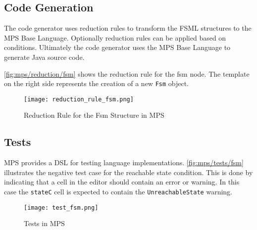 \subsection{Code Generation}

The code generator uses reduction rules to transform the FSML structures to the MPS Base Language.
Optionally reduction rules can be applied based on conditions.
Ultimately the code generator uses the MPS Base Language to generate Java source code.

\autoref{fig:mps/reduction/fsm} shows the reduction rule for the fsm node. 
The template on the right side represents the creation of a new \lstinline{Fsm} object.

\begin{figure}[H]
	\texttt{[image: reduction\_rule\_fsm.png]}
	\caption{Reduction Rule for the Fsm Structure in MPS}
	\label{fig:mps/reduction/fsm}
\end{figure}

\subsection{Tests}

MPS provides a DSL for testing language implementations.
\autoref{fig:mps/tests/fsm} illustrates the negative test case for the reachable state condition. 
This is done by indicating that a cell in the editor should contain an error or warning.
In this case the \lstinline{stateC} cell is expected to contain the \lstinline{UnreachableState} warning.


\begin{figure}[H]
	\centering
	\texttt{[image: test\_fsm.png]}
	\caption{Tests in MPS} 
	\label{fig:mps/tests/fsm}
\end{figure}
